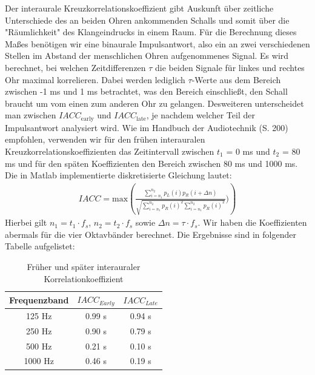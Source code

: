 Der interaurale Kreuzkorrelationskoeffizient gibt Auskunft über zeitliche Unterschiede des an beiden Ohren ankommenden Schalls und somit über die "Räumlichkeit" des Klangeindrucks in einem Raum. 
Für die Berechnung dieses Maßes benötigen wir eine binaurale Impulsantwort, also ein an zwei verschiedenen Stellen im Abstand der menschlichen Ohren aufgenommenes Signal. 
Es wird berechnet, bei welchen Zeitdifferenzen $\tau$ die beiden Signale für linkes und rechtes Ohr maximal korrelieren.
Dabei werden lediglich $\tau$-Werte aus dem Bereich zwischen -1 ms und 1 ms betrachtet, was den Bereich einschließt, den Schall braucht um vom einen zum anderen Ohr zu gelangen.  
Desweiteren unterscheidet man zwischen $IACC_{\mathrm{early}}$ und $IACC_{\mathrm{late}}$, je nachdem welcher Teil der Impulsantwort analysiert wird. Wie im Handbuch der Audiotechnik \cite{Weinzierl08} (S. 200) empfohlen, verwenden wir für den frühen interauralen Kreuzkorrelationskoeffizienten das Zeitintervall zwischen $t_1$ = 0 ms und $t_2$ = 80 ms und für den späten Koeffizienten den Bereich zwischen 80 ms und 1000 ms. 
Die in Matlab implementierte diskretisierte Gleichung lautet:
\begin{align*}
IACC = \mathrm{max}\left( \frac{\sum_{i=n_1}^{n_2} p_L(i)p_R(i+\Delta n)} {\sqrt{\sum_{i=n_1}^{n_2}p_R(i)^2 \sum_{i=n_1}^{n_2} p_R(i)^2 }})\right) 
\end{align*}
Hierbei gilt $n_1 = t_1 \cdot f_s$,  $n_2 = t_2 \cdot f_s$ sowie $\Delta n = \tau \cdot f_s$.
Wir haben die Koeffizienten abermals für die vier Oktavbänder berechnet.
Die Ergebnisse sind in folgender Tabelle aufgelistet:
\begin{table}[H]
    \centering
    \caption{Früher und später interauraler Korrelationkoeffizient}
    \label{tab:iacc}
    \begin{tabular}[\textwidth]{|c|c|c|}
    \hline
        Frequenzband & $IACC_{Early}$ &$IACC_{Late}$ \\
        \hline
        125 Hz & 0.99 s & 0.94 s \\
        250 Hz & 0.90 s & 0.79 s \\
        500 Hz & 0.21 s & 0.10 s \\
        1000 Hz & 0.46 s & 0.19 s \\
        \hline
    \end{tabular}
\end{table}

